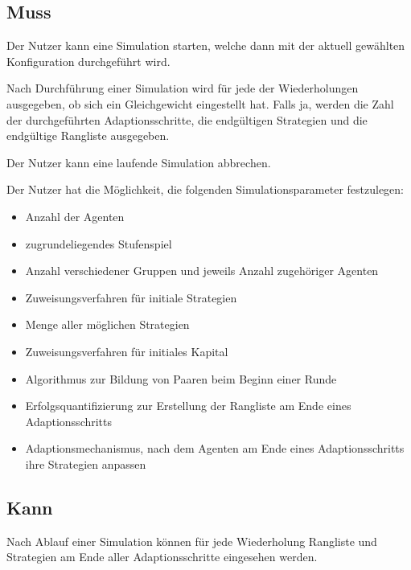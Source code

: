 \documentclass[parskip=full,11pt]{scrartcl}
\def\adapt{Adaptionsschritt}
\def\adapts{Adaptionsschritte}
\begin{document}
\subsection{Muss}


Der Nutzer kann eine Simulation starten, welche dann mit der aktuell gewählten Konfiguration durchgeführt wird.


Nach Durchführung einer Simulation wird für jede der Wiederholungen ausgegeben, ob sich ein Gleichgewicht eingestellt hat. Falls ja, werden die Zahl der durchgeführten \adapts, die endgültigen Strategien und die endgültige Rangliste ausgegeben.


Der Nutzer kann eine laufende Simulation abbrechen.


Der Nutzer hat die Möglichkeit, die folgenden Simulationsparameter festzulegen:
\begin{itemize} \itemsep -10pt
\item Anzahl der Agenten
\item zugrundeliegendes Stufenspiel
\item Anzahl verschiedener Gruppen und jeweils Anzahl zugehöriger Agenten
\item Zuweisungsverfahren für initiale Strategien
\item Menge aller möglichen Strategien
\item Zuweisungsverfahren für initiales Kapital
\item Algorithmus zur Bildung von Paaren beim Beginn einer Runde
\item Erfolgsquantifizierung zur Erstellung der Rangliste am Ende eines \adapt s
\item Adaptionsmechanismus, nach dem Agenten am Ende eines \adapt s ihre Strategien anpassen
\end{itemize}

\subsection{Kann}

Nach Ablauf einer Simulation können für jede Wiederholung Rangliste und Strategien am Ende aller Adaptionsschritte eingesehen werden.
\end{document}
